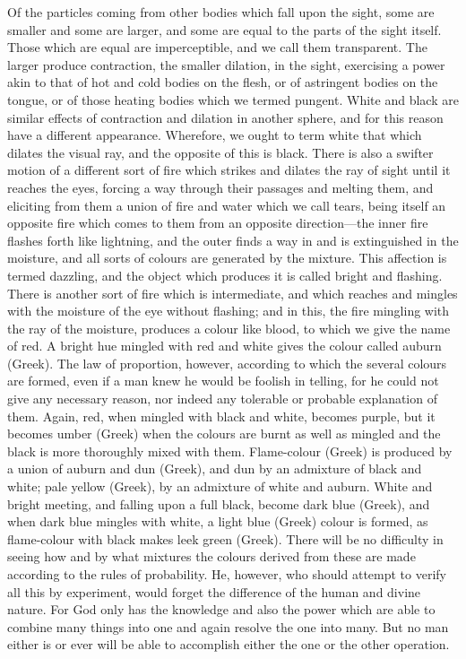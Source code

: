 \documentclass[11pt,letter]{article}
\begin{document}
\par  Of the particles coming from other bodies which fall upon the sight, some are smaller and some are larger, and some are equal to the parts of the sight itself. Those which are equal are imperceptible, and we call them transparent. The larger produce contraction, the smaller dilation, in the sight, exercising a power akin to that of hot and cold bodies on the flesh, or of astringent bodies on the tongue, or of those heating bodies which we termed pungent. White and black are similar effects of contraction and dilation in another sphere, and for this reason have a different appearance. Wherefore, we ought to term white that which dilates the visual ray, and the opposite of this is black. There is also a swifter motion of a different sort of fire which strikes and dilates the ray of sight until it reaches the eyes, forcing a way through their passages and melting them, and eliciting from them a union of fire and water which we call tears, being itself an opposite fire which comes to them from an opposite direction—the inner fire flashes forth like lightning, and the outer finds a way in and is extinguished in the moisture, and all sorts of colours are generated by the mixture. This affection is termed dazzling, and the object which produces it is called bright and flashing. There is another sort of fire which is intermediate, and which reaches and mingles with the moisture of the eye without flashing; and in this, the fire mingling with the ray of the moisture, produces a colour like blood, to which we give the name of red. A bright hue mingled with red and white gives the colour called auburn (Greek). The law of proportion, however, according to which the several colours are formed, even if a man knew he would be foolish in telling, for he could not give any necessary reason, nor indeed any tolerable or probable explanation of them. Again, red, when mingled with black and white, becomes purple, but it becomes umber (Greek) when the colours are burnt as well as mingled and the black is more thoroughly mixed with them. Flame-colour (Greek) is produced by a union of auburn and dun (Greek), and dun by an admixture of black and white; pale yellow (Greek), by an admixture of white and auburn. White and bright meeting, and falling upon a full black, become dark blue (Greek), and when dark blue mingles with white, a light blue (Greek) colour is formed, as flame-colour with black makes leek green (Greek). There will be no difficulty in seeing how and by what mixtures the colours derived from these are made according to the rules of probability. He, however, who should attempt to verify all this by experiment, would forget the difference of the human and divine nature. For God only has the knowledge and also the power which are able to combine many things into one and again resolve the one into many. But no man either is or ever will be able to accomplish either the one or the other operation.
\end{document}
